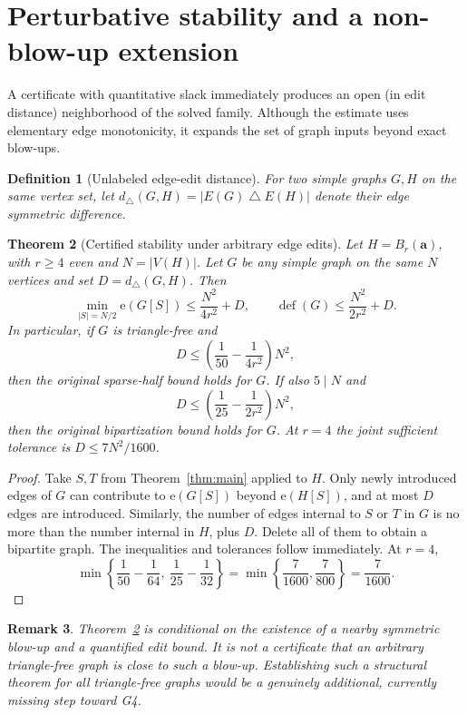 \documentclass[11pt,a4paper]{article}
\newtheorem{theorem}{Theorem}[section]
\newtheorem{definition}[theorem]{Definition}
\newtheorem{remark}[theorem]{Remark}
\newcommand{\edges}{\mathrm e}
\newcommand{\defect}{\operatorname{def}}
\newcommand{\card}[1]{\lvert#1\rvert}
\begin{document}
\section{Perturbative stability and a non-blow-up extension}
A certificate with quantitative slack immediately produces an open (in edit distance) neighborhood of the solved family. Although the estimate uses elementary edge monotonicity, it expands the set of graph inputs beyond exact blow-ups.
\begin{definition}[Unlabeled edge-edit distance]\label{def:edit}
For two simple graphs $G,H$ on the same vertex set, let
$d_\triangle(G,H)=\card{E(G)\mathbin\triangle E(H)}$ denote their edge symmetric difference.
\end{definition}
\begin{theorem}[Certified stability under arbitrary edge edits]\label{thm:stability}
Let $H=B_r(\mathbf a)$, with $r\ge4$ even and $N=\card{V(H)}$. Let $G$ be \emph{any} simple graph on the same $N$ vertices and set $D=d_\triangle(G,H)$. Then
\[
 \min_{\card S=N/2}\edges(G[S])\le\frac{N^2}{4r^2}+D,
 \qquad
 \defect(G)\le\frac{N^2}{2r^2}+D.
\]
In particular, if $G$ is triangle-free and
\begin{equation}\label{eq:tolerance}
 D\le\left(\frac1{50}-\frac1{4r^2}\right)N^2,
\end{equation}
then the original sparse-half bound holds for $G$. If also $5\mid N$ and
\[
 D\le\left(\frac1{25}-\frac1{2r^2}\right)N^2,
\]
then the original bipartization bound holds for $G$. At $r=4$ the joint sufficient tolerance is $D\le 7N^2/1600$.
\end{theorem}
\begin{proof}
Take $S,T$ from Theorem~\ref{thm:main} applied to $H$. Only newly introduced edges of $G$ can contribute to $\edges(G[S])$ beyond $\edges(H[S])$, and at most $D$ edges are introduced. Similarly, the number of edges internal to $S$ or $T$ in $G$ is no more than the number internal in $H$, plus $D$. Delete all of them to obtain a bipartite graph. The inequalities and tolerances follow immediately. At $r=4$,
\[
 \min\left\{\frac1{50}-\frac1{64},\ \frac1{25}-\frac1{32}\right\}
 =\min\left\{\frac7{1600},\frac7{800}\right\}=\frac7{1600}.
\]
\end{proof}
\begin{remark}
Theorem~\ref{thm:stability} is conditional on the \emph{existence of a nearby symmetric blow-up} and a quantified edit bound. It is not a certificate that an arbitrary triangle-free graph is close to such a blow-up. Establishing such a structural theorem for all triangle-free graphs would be a genuinely additional, currently missing step toward G4.
\end{remark}
\end{document}

